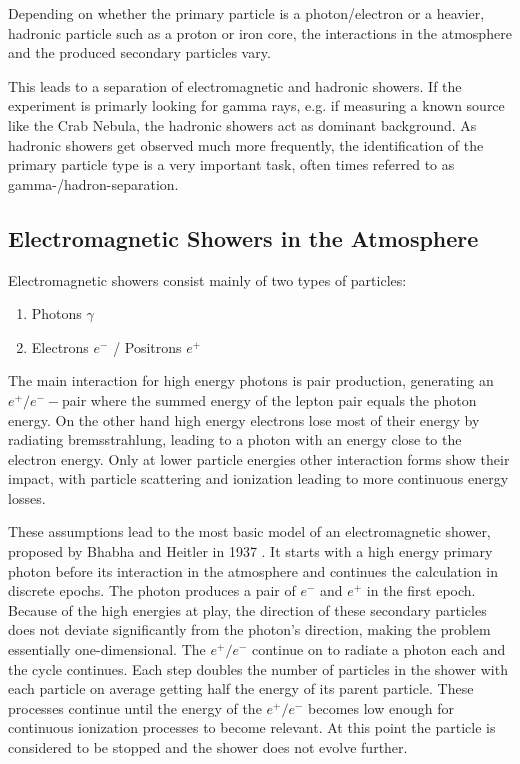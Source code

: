 Depending on whether the primary particle is 
a photon/electron or a heavier, hadronic particle such as a proton 
or iron core, the interactions in the atmosphere and the 
produced secondary particles vary.

This leads to a separation of electromagnetic and hadronic showers.
If the experiment is primarly looking for 
gamma rays, e.g. if measuring a known source like the Crab Nebula, 
the hadronic showers act as dominant background.
As hadronic showers get observed much more frequently, 
the identification of the primary particle type is a very important 
task, often times referred to as gamma-/hadron-separation.

\subsection{Electromagnetic Showers in the Atmosphere}
Electromagnetic showers consist mainly of two types of particles:
\begin{enumerate}
	\item{Photons $\gamma$}
	\item{Electrons $e^-$ / Positrons $e^+$}
\end{enumerate}

The main interaction for high energy photons is pair 
production, generating an $e^+/e^--$pair where the summed energy of 
the lepton pair equals the photon energy.
On the other hand high energy electrons lose 
most of their energy by radiating bremsstrahlung, leading to a photon with 
an energy close to the electron energy.
Only at lower particle energies other interaction forms show their impact,
with particle scattering and ionization 
leading to more continuous energy losses.

These assumptions lead to the most basic model of an 
electromagnetic shower, proposed by Bhabha and Heitler in 1937
\cite{doi:10.1098/rspa.1937.0082}.
It starts with a high energy primary photon before its interaction in the atmosphere 
and continues the calculation in discrete epochs.
The photon produces a pair of $e^-$ and $e^+$ in the first epoch.
Because of the high energies at play, the direction of these secondary 
particles does not deviate significantly from the photon's direction, 
making the problem essentially one-dimensional.
The $e^+/e^-$ continue on to radiate a photon each and the cycle continues.
Each step doubles the number of particles in the shower with each particle 
on average getting half the energy of its parent particle.
These processes continue until the energy of the $e^+/e^-$ becomes low enough for
continuous ionization processes to become relevant.
At this point the particle is considered to be stopped and the shower
does not evolve further.

